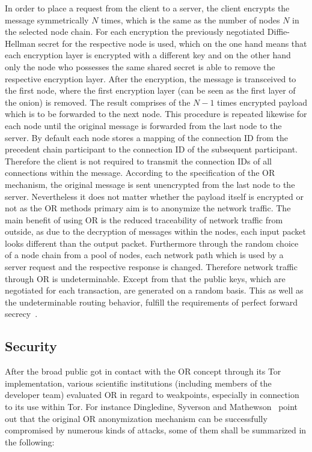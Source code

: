 \documentclass{sig-alternate}
\begin{document}
In order to place a request from the client to a server, the client encrypts the message symmetrically $N$ times, which is the same as the number of nodes $N$ in the selected node chain. For each encryption the previously negotiated Diffie-Hellman secret for the respective node is used, which on the one hand means that each encryption layer is encrypted with a different key and on the other hand only the node who possesses the same shared secret is able to remove the respective encryption layer.
After the encryption, the message is transceived to the first node, where the first encryption layer (can be seen as the first layer of the onion) is removed. The result comprises of the $N-1$ times encrypted payload which is to be forwarded to the next node. This procedure is repeated likewise for each node until the original message is forwarded from the last node to the server. By default each node stores a mapping of the connection ID from the precedent chain participant to the connection ID of the subsequent participant. Therefore the client is not required to transmit the connection IDs of all connections within the message. According to the specification of the OR mechanism, the original message is sent unencrypted from the last node to the server. Nevertheless it does not matter whether the payload itself is encrypted or not as the OR methods primary aim is to anonymize the network traffic.
The main benefit of using OR is the reduced traceability of network traffic from outside, as due to the decryption of messages within the nodes, each input packet looks different than the output packet. Furthermore through the random choice of a node chain from a pool of nodes, each network path which is used by a server request and the respective response is changed. Therefore network traffic through OR is undeterminable. Except from that the public keys, which are negotiated for each transaction, are generated on a random basis. This as well as the undeterminable routing behavior, fulfill the requirements of perfect forward secrecy~\cite{diffie1992authentication}.  

\subsection{Security}

After the broad public got in contact with the OR concept through its Tor implementation, various scientific institutions (including members of the developer team) evaluated OR in regard to weakpoints, especially in connection to its use within Tor. For instance Dingledine, Syverson and Mathewson~\cite{dingledine2004tor} point out that the original OR anonymization mechanism can be successfully compromised by numerous kinds of attacks, some of them shall be summarized in the following:
\end{document}
